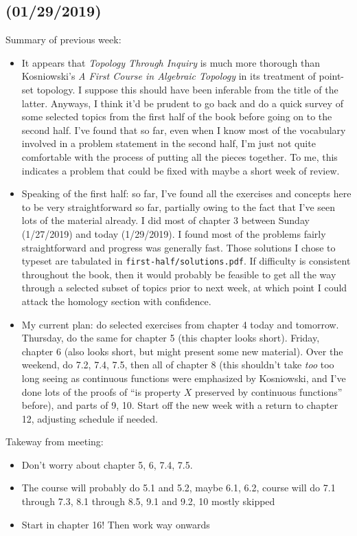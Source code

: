 \documentclass{fkbook}
\begin{document}
\subsection*{(01/29/2019)}
Summary of previous week:
\begin{itemize}
  \item It appears that \emph{Topology Through Inquiry} is much more thorough
    than Kosniowski's \emph{A First Course in Algebraic Topology} in its
    treatment of point-set topology. I suppose this should have been inferable
    from the title of the latter. Anyways, I think it'd be prudent to go back
    and do a quick survey of some selected topics from the first half of the
    book before going on to the second half. I've found that so far, even when
    I know most of the vocabulary involved in a problem statement in the second
    half, I'm just not quite comfortable with the process of putting all the
    pieces together. To me, this indicates a problem that could be fixed with
    maybe a short week of review.

  \item Speaking of the first half: so far, I've found all the exercises and
    concepts here to be very straightforward so far, partially owing to the fact
    that I've seen lots of the material already. I did most of chapter 3 between
    Sunday (1/27/2019) and today (1/29/2019). I found most of the problems
    fairly straightforward and progress was generally fast. Those solutions I
    chose to typeset are tabulated in \texttt{first-half/solutions.pdf}. If
    difficulty is consistent throughout the book, then it would probably be
    feasible to get all the way through a selected subset of topics prior to
    next week, at which point I could attack the homology section with
    confidence.

  \item My current plan: do selected exercises from chapter 4 today and
    tomorrow. Thursday, do the same for chapter 5 (this chapter looks short).
    Friday, chapter 6 (also looks short, but might present some new material).
    Over the weekend, do 7.2, 7.4, 7.5, then all of chapter 8 (this shouldn't
    take \emph{too} too long seeing as continuous functions were emphasized by
    Kosniowski, and I've done lots of the proofs of ``is property $X$ preserved
    by continuous functions'' before), and parts of 9, 10. Start off the new
    week with a return to chapter 12, adjusting schedule if needed.
\end{itemize}
Takeway from meeting:
\begin{itemize}
  \item Don't worry about chapter 5, 6, 7.4, 7.5.
  \item The course will probably do 5.1 and 5.2, maybe 6.1, 6.2, course will do
    7.1 through 7.3, 8.1 through 8.5, 9.1 and 9.2, 10 mostly skipped
  \item Start in chapter 16! Then work way onwards
\end{itemize}

\mainmatter
\pagestyle{main}


\end{document}
